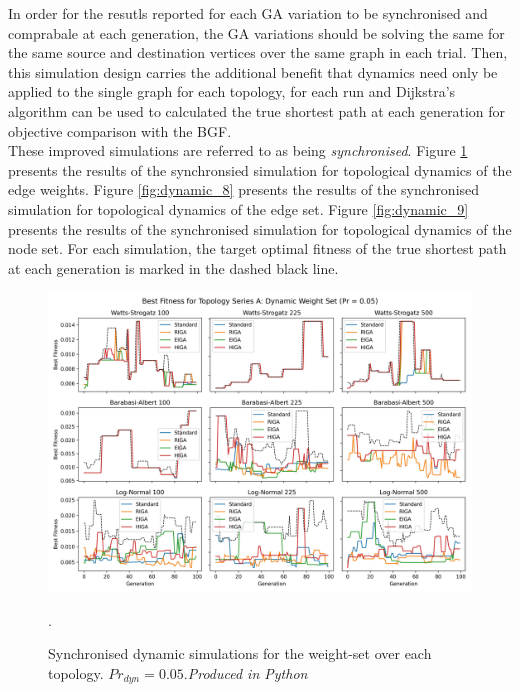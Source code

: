 \documentclass[
	a4paper, %
	10pt, %
	unnumberedsections, %
	twoside, %
]{LTJournalArticle}
\begin{document}
In order for the resutls reported for each GA variation to be synchronised and comprabale at each generation, the GA variations should be solving the same for the same source and destination vertices over the same graph in each trial. Then, this simulation design carries the additional benefit that dynamics need only be applied to the single graph for each topology, for each run and Dijkstra's algorithm can be used to calculated the true shortest path at each generation for objective comparison with the BGF. \\

These improved simulations are referred to as being \emph{synchronised}. Figure \ref{fig:dynamic_7} presents the results of the synchronsied simulation for topological dynamics of the edge weights. Figure \ref{fig:dynamic_8} presents the results of the synchronised simulation for topological dynamics of the edge set. Figure \ref{fig:dynamic_9} presents the results of the synchronised simulation for topological dynamics of the node set. For each simulation, the target optimal fitness of the true shortest path at each generation is marked in the dashed black line. \\

 \begin{figure}
	\includegraphics[width=\linewidth]{Figures/sims/dynamic/series_a_weight_sync.jpg}
	\caption{Synchronised dynamic simulations for the weight-set over each topology. \(Pr_{dyn} = 0.05\).\emph{Produced in Python}}. 
	\label{fig:dynamic_7}
\end{figure}
\end{document}
